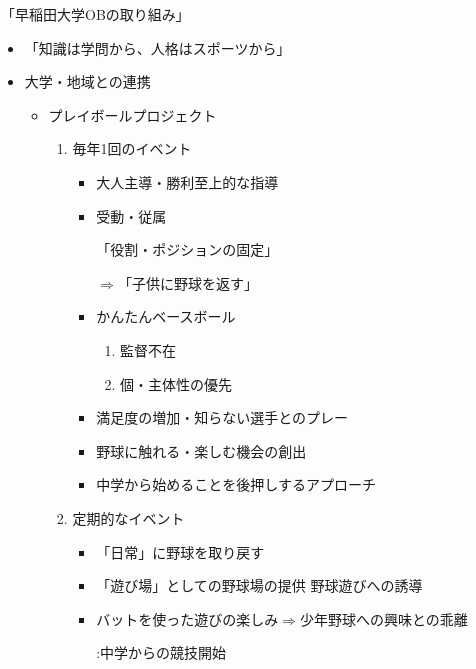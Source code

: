 \documentclass[dvipdfmx, 10.5pt]{jsarticle}
\begin{document}
  「早稲田大学OBの取り組み」

  \begin{itemize}
    \item 「知識は学問から、人格はスポーツから」

    \item 大学・地域との連携

    \begin{itemize}
      \item プレイボールプロジェクト

      \begin{enumerate}
        \item 毎年1回のイベント

        \begin{itemize}
          \item 大人主導・勝利至上的な指導

          \item 受動・従属

          「役割・ポジションの固定」

          $\Rightarrow$「子供に野球を返す」

          \item かんたんベースボール

          \begin{enumerate}
            \item 監督不在

            \item 個・主体性の優先

          \end{enumerate}

          \item 満足度の増加・知らない選手とのプレー

          \item 野球に触れる・楽しむ機会の創出

          \item 中学から始めることを後押しするアプローチ

        \end{itemize}

        \item 定期的なイベント

        \begin{itemize}
          \item 「日常」に野球を取り戻す

          \item 「遊び場」としての野球場の提供 野球遊びへの誘導

          \item バットを使った遊びの楽しみ$\Rightarrow$少年野球への興味との乖離

          :中学からの競技開始

        \end{itemize}



      \end{enumerate}
    \end{itemize}
  \end{itemize}
\end{document}
